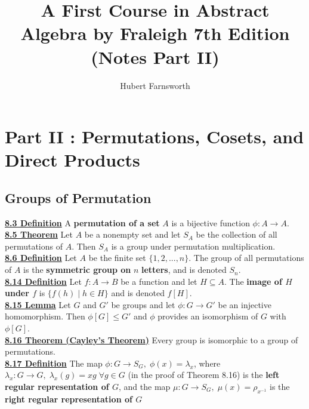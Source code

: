 \documentclass[12pt, letterpaper]{article}
\begin{document}
\title{A First Course in Abstract Algebra by Fraleigh 7th Edition (Notes Part II)}
\author{Hubert Farnsworth }  
\begin{titlepage}
\maketitle
\end{titlepage}
 

 
\section{Part II : Permutations, Cosets, and Direct Products}


\subsection{Groups of Permutation}

\noindent \underline{\bf 8.3 Definition} A {\bf permutation of a set} $A$ is a bijective function $\phi : A \rightarrow A$.\\

\noindent \underline{\bf 8.5 Theorem} Let $A$ be a nonempty set and let $S_A$ be the collection of all permutations of $A$. Then $S_A$ is a group under permutation multiplication. \\

\noindent \underline{\bf 8.6 Definition} Let $A$ be the finite set $\{1,2,...,n\}$. The group of all permutations of $A$ is the {\bf symmetric group on} $n$ {\bf letters}, and is denoted $S_n$. \\

\noindent \underline{\bf 8.14 Definition} Let $f: A \rightarrow B$ be a function and let $H \subseteq A$. The {\bf image of $H$ under $f$} is $\{f(h) \; | \; h \in H \}$ and is denoted $f[H]$. \\

\noindent \underline{\bf 8.15 Lemma} Let $G$ and $G'$ be groups and let $\phi : G \rightarrow G'$ be an injective homomorphism. Then $\phi [G] \leq G'$ and $\phi$ provides an isomorphism of $G$ with $\phi[G]$. \\

\noindent \underline{\bf 8.16 Theorem (Cayley's Theorem)} Every group is isomorphic to a group of permutations. \\

\noindent \underline{\bf 8.17 Definition} The map $\phi : G \rightarrow S_G, \; \phi(x) = \lambda_x$, where $\lambda_x : G \rightarrow G, \; \lambda_x(g) = xg \; \forall g \in G$ (in the proof of Theorem 8.16) is the {\bf left regular representation of $G$}, and the map $\mu : G \rightarrow S_G, \; \mu (x) = \rho_{x^{-1}}$ is the {\bf right regular representation of $G$}\\
\end{document}
